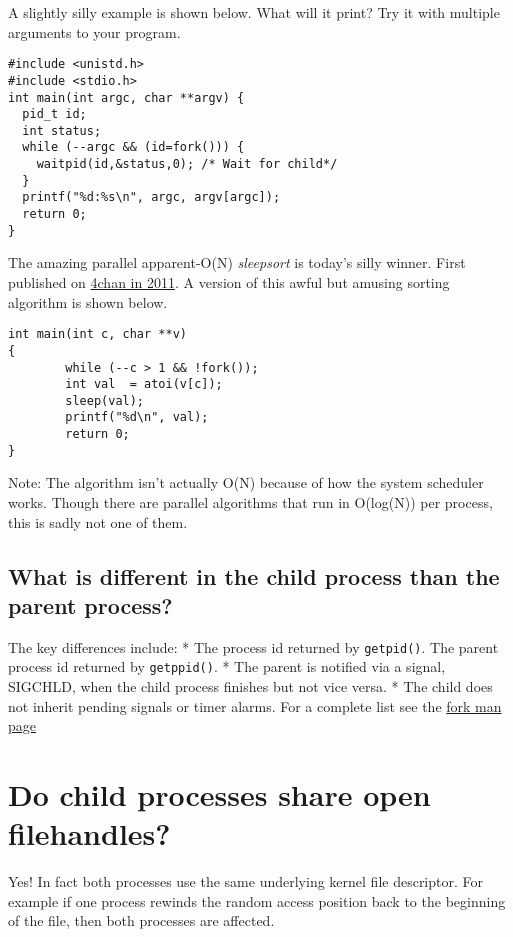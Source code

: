 A slightly silly example is shown below. What will it print? Try it with
multiple arguments to your program.

\begin{verbatim}
#include <unistd.h>
#include <stdio.h>
int main(int argc, char **argv) {
  pid_t id;
  int status; 
  while (--argc && (id=fork())) {
    waitpid(id,&status,0); /* Wait for child*/
  }
  printf("%d:%s\n", argc, argv[argc]);
  return 0;
}
\end{verbatim}

The amazing parallel apparent-O(N) \emph{sleepsort} is today's silly
winner. First published on
\href{https://dis.4chan.org/read/prog/1295544154}{4chan in 2011}. A
version of this awful but amusing sorting algorithm is shown below.

\begin{verbatim}
int main(int c, char **v)
{
        while (--c > 1 && !fork());
        int val  = atoi(v[c]);
        sleep(val);
        printf("%d\n", val);
        return 0;
}
\end{verbatim}

Note: The algorithm isn't actually O(N) because of how the system
scheduler works. Though there are parallel algorithms that run in
O(log(N)) per process, this is sadly not one of them.

\subsection{What is different in the child process than the parent
process?}\label{what-is-different-in-the-child-process-than-the-parent-process}

The key differences include: * The process id returned by
\texttt{getpid()}. The parent process id returned by \texttt{getppid()}.
* The parent is notified via a signal, SIGCHLD, when the child process
finishes but not vice versa. * The child does not inherit pending
signals or timer alarms. For a complete list see the
\href{http://man7.org/linux/man-pages/man2/fork.2.html}{fork man page}

\section{Do child processes share open
filehandles?}\label{do-child-processes-share-open-filehandles}

Yes! In fact both processes use the same underlying kernel file
descriptor. For example if one process rewinds the random access
position back to the beginning of the file, then both processes are
affected.


